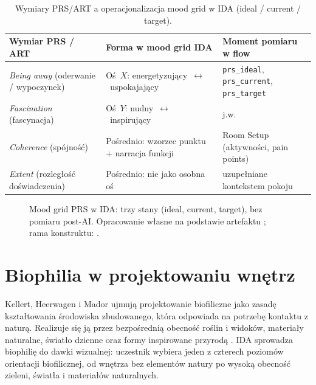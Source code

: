 \begin{table}[htbp]
  \centering
  \caption{Wymiary PRS/ART a operacjonalizacja mood grid w IDA (ideal / current / target).}
  \label{tab:ch02:prs-mood-grid}
  \begin{tabular}{@{}p{}p{}p{}@{}}
    \toprule
    Wymiar PRS / ART & Forma w mood grid IDA & Moment pomiaru w flow \\
    \midrule
    \emph{Being away} (oderwanie / wypoczynek)
      & Oś~$X$: energetyzujący~$\leftrightarrow$~uspokajający
      & \texttt{prs\_ideal}, \texttt{prs\_current}, \texttt{prs\_target} \\
    \emph{Fascination} (fascynacja)
      & Oś~$Y$: nudny~$\leftrightarrow$~inspirujący
      & j.w. \\
    \emph{Coherence} (spójność)
      & Pośrednio: wzorzec punktu + narracja funkcji
      & Room Setup (aktywności, pain points) \\
    \emph{Extent} (rozległość doświadczenia)
      & Pośrednio: nie jako osobna oś
      & uzupełniane kontekstem pokoju \\
    \bottomrule
  \end{tabular}
\end{table}

\begin{figure}[htbp]
  \centering
  \caption{Mood grid PRS w IDA: trzy stany (ideal, current, target), bez pomiaru post-AI.
    Opracowanie własne na podstawie artefaktu \parencite{idaPlatform2026}; rama konstruktu: \textcite{hartig1997prs}.}
  \label{fig:ch02:prs-mood-grid}
\end{figure}

\section{Biophilia w projektowaniu wnętrz}
\label{ch02:sec:biophilia}

Kellert, Heerwagen i Mador ujmują projektowanie biofiliczne jako zasadę kształtowania środowiska zbudowanego, która odpowiada na potrzebę kontaktu z naturą. Realizuje się ją przez bezpośrednią obecność roślin i widoków, materiały naturalne, światło dzienne oraz formy inspirowane przyrodą \parencite{kellert2008biophilic}.
IDA sprowadza biophilię do dawki wizualnej: uczestnik wybiera jeden z czterech poziomów orientacji biofilicznej, od wnętrza bez elementów natury po wysoką obecność zieleni, światła i materiałów naturalnych.

